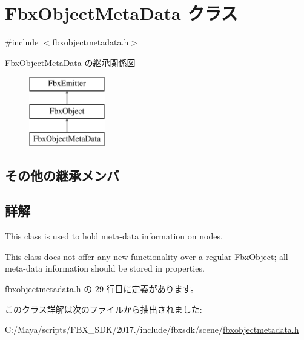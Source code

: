 \hypertarget{class_fbx_object_meta_data}{}\section{Fbx\+Object\+Meta\+Data クラス}
\label{class_fbx_object_meta_data}


{\ttfamily \#include $<$fbxobjectmetadata.\+h$>$}

Fbx\+Object\+Meta\+Data の継承関係図\begin{figure}[H]
\begin{center}
\leavevmode
\includegraphics[height=3.000000cm]{class_fbx_object_meta_data}
\end{center}
\end{figure}
\subsection*{その他の継承メンバ}


\subsection{詳解}
This class is used to hold meta-\/data information on nodes.

This class does not offer any new functionality over a regular \hyperlink{class_fbx_object}{Fbx\+Object}; all meta-\/data information should be stored in properties. 

 fbxobjectmetadata.\+h の 29 行目に定義があります。



このクラス詳解は次のファイルから抽出されました\+:\begin{DoxyCompactItemize}
\item 
C\+:/\+Maya/scripts/\+F\+B\+X\+\_\+\+S\+D\+K/2017./include/fbxsdk/scene/\hyperlink{fbxobjectmetadata_8h}{fbxobjectmetadata.\+h}\end{DoxyCompactItemize}
